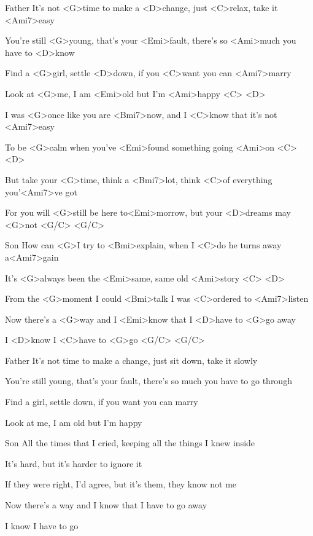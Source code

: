

Father
\zs
It's not <G>time to make a <D>change, just <C>relax, take it <Ami7>easy

You're still <G>young, that's your <Emi>fault, there's so <Ami>much you have to <D>know

Find a <G>girl, settle <D>down, if you <C>want you can <Ami7>marry

Look at <G>me, I am <Emi>old but I'm <Ami>happy <C> <D>
\ks

\zs
I was <G>once like you are <Bmi7>now, and I <C>know that it's not <Ami7>easy

To be <G>calm when you've <Emi>found something going <Ami>on <C> <D>

But take your <G>time, think a <Bmi7>lot, think <C>of everything you'<Ami7>ve got

For you will <G>still be here to<Emi>morrow, but your <D>dreams may <G>not <G/C> <G/C>
\ks

Son
\zs
How can <G>I try to <Bmi>explain, when I <C>do he turns away a<Ami7>gain

It's <G>always been the <Emi>same, same old <Ami>story <C> <D>

From the <G>moment I could <Bmi>talk I was <C>ordered to <Ami7>listen

Now there's a <G>way and I <Emi>know that I <D>have to <G>go away

I <D>know I <C>have to <G>go <G/C> <G/C>\\
\ks

Father
\zs
It's not time to make a change, just sit down, take it slowly

You're still young, that's your fault, there's so much you have to go through

Find a girl, settle down, if you want you can marry

Look at me, I am old but I'm happy
\ks

Son
\zs
All the times that I cried, keeping all the things I knew inside

It's hard, but it's harder to ignore it

If they were right, I'd agree, but it's them, they know not me

Now there's a way and I know that I have to go away

I know I have to go
\ks

\kp
